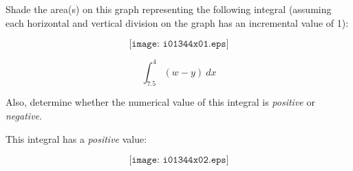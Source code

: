 

Shade the area(s) on this graph representing the following integral (assuming each horizontal and vertical division on the graph has an incremental value of 1):

$$\texttt{[image: i01344x01.eps]}$$

$$\int_{7.5}^{4} (w - y) \> dx$$

Also, determine whether the numerical value of this integral is {\it positive} or {\it negative}.







This integral has a {\it positive} value:

$$\texttt{[image: i01344x02.eps]}$$











